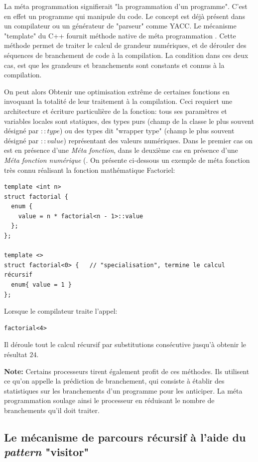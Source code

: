 \documentclass{report}
\begin{document}
La méta programmation signifierait "la programmation d'un programme". C'est en effet un programme qui manipule du code. Le concept est déjà présent dans un compilateur ou un générateur de "parseur" comme YACC. Le mécanisme "template" du C++ fournit méthode native de méta programmation \cite[p2,3]{bib_metaprogramming}. Cette méthode permet de traiter le calcul de grandeur numériques, et de dérouler des séquences de branchement de code à la compilation. La condition dans ces deux cas, est que les grandeurs et branchements sont constants et connus à la compilation.

On peut alors Obtenir une optimisation extrême de certaines fonctions en invoquant la totalité de leur traitement à la compilation. Ceci requiert une architecture et écriture particulière de la fonction: tous ses paramètres et variables locales sont statiques, des types purs (champ de la classe le plus souvent désigné par $::type$) ou des types dit "wrapper type" (champ le plus souvent désigné par $::value$) représentant des valeurs numériques. Dans le premier cas on est en présence d'une \emph{Méta fonction}, dans le deuxième cas en présence d'une \emph{Méta fonction numérique} (\cite[(2.9)]{bib_metaprogramming}. On présente ci-dessous un exemple de méta fonction très connu réalisant la fonction mathématique Factoriel:

\begin{verbatim}
template <int n>
struct factorial {
  enum {
    value = n * factorial<n - 1>::value
  };
};

template <>
struct factorial<0> {   // "specialisation", termine le calcul récursif
  enum{ value = 1 }
};
\end{verbatim} 

Lorsque le compilateur traite l'appel:

\begin{verbatim}
factorial<4>
\end{verbatim}

Il déroule tout le calcul récursif par substitutions consécutive jusqu'à obtenir le résultat $24$.

\textbf{Note:} Certains processeurs tirent également profit de ces méthodes. Ils utilisent ce qu'on appelle la prédiction de branchement, qui consiste à établir des statistiques sur les branchements d'un programme pour les anticiper. La méta programmation soulage ainsi le processeur en réduisant le nombre de branchements qu'il doit traiter.  

\subsection{Le mécanisme de parcours récursif à l'aide du \emph{pattern} "visitor"} \label{ch_concepts_visiteurs}
\end{document}
